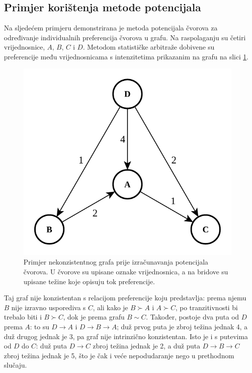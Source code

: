 \documentclass[lmodern, utf8, diplomski, numeric]{fer}
\begin{document}
  \subsection{Primjer korištenja metode potencijala}
  Na sljedećem primjeru demonstrirana je metoda potencijala čvorova za određivanje individualnih preferencija čvorova u grafu.
  Na raspolaganju su četiri vrijednosnice, $A$, $B$, $C$ i $D$.
  Metodom statističke arbitraže dobivene su preferencije među vrijednosnicama s intenzitetima prikazanim na grafu na slici \ref{fig:graph-eg-1}.
  
  \begin{figure}[h]
    \centering
    \includegraphics[width=0.5\linewidth]{graphics/graph-eg-1.pdf}
    \caption{Primjer nekonzistentnog grafa prije izračunavanja potencijala čvorova.
      U čvorove su upisane oznake vrijednosnica, a na bridove su upisane težine koje opisuju tok preferencije.}
    \label{fig:graph-eg-1}
  \end{figure}
  
  Taj graf nije konzistentan s relacijom preferencije koju predstavlja: prema njemu $B$ nije izravno usporediva s $C$, ali kako je $B \succ A$ i $A \succ C$, po tranzitivnosti bi trebalo biti i $B \succ C$, dok je prema grafu $B \sim C$.
  Također, postoje dva puta od $D$ prema $A$: to su $D \rightarrow A$ i $D \rightarrow B \rightarrow A$; duž prvog puta je zbroj težina jednak 4, a duž drugog jednak je 3, pa graf nije intrinzično konzistentan.
  Isto je i s putevima od $D$ do $C$: duž puta $D \rightarrow C$ zbroj težina jednak je 2, a duž puta $D \rightarrow B \rightarrow C$ zbroj težina jednak je 5, što je čak i veće nepodudaranje nego u prethodnom slučaju.
  
\end{document}
